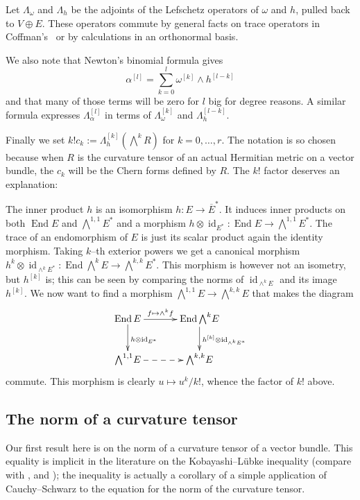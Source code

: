 \documentclass[11pt,a4paper]{amsart}
\def\^#1{^{[#1]}}
\DeclareMathOperator{\id}{id}
\DeclareMathOperator{\End}{End}
\theoremstyle{definition}
\theoremstyle{remark}
\numberwithin{equation}{section}
\begin{document}
Let $\Lambda_\omega$ and $\Lambda_h$ be the adjoints of the Lefschetz
operators of $\omega$ and $h$, pulled back to $V \oplus E$. These
operators commute by general facts on trace operators in
Coffman's~\cite{Coffman} or by calculations in an orthonormal basis.

We also note that Newton's binomial formula gives
$$
\alpha\^{l} = \sum_{k=0}^{l} \omega\^{k} \wedge h\^{l-k}
$$
and that many of those terms will be zero for $l$ big for degree
reasons. A similar formula expresses $\Lambda\^{l}_\alpha$ in terms of
$\Lambda\^{k}_\omega$ and $\Lambda\^{l-k}_h$.

Finally we set $k! c_k := \Lambda\^{k}_h (\bigwedge^k \! R)$ for $k = 0, \ldots,
r$.  The notation is so chosen because when $R$ is the curvature tensor of
an actual Hermitian metric on a vector bundle, the $c_k$ will be the Chern
forms defined by $R$. The $k!$ factor deserves an explanation:

The inner product $h$ is an isomorphism $h : E \to \overline E^*$. It
induces inner products on both $\End E$ and $\bigwedge^{1,1} \! E^*$ and a
morphism $h  \otimes \id_{E^*}: \End E \to \bigwedge^{1,1} \!
E^*$. The trace of an endomorphism of $E$ is just its scalar product
again the identity morphism.  Taking $k$--th exterior powers we get a
canonical morphism
$h^k \otimes \id_{\wedge^k E^*} : \End \bigwedge^k \! E \to
\bigwedge^{k,k} \! E^*$. This morphism is however not an isometry, but
$h\^k$ is; this can be seen by comparing the norms of $\id_{\wedge^k
E}$ and its image $h\^k$. We now want to find a morphism
$\bigwedge^{1,1} \! E \to \bigwedge^{k,k} \! E$ that makes the diagram
$$
\xymatrix@C+10pt{
    \End E \ar[r]^-{f \mapsto \wedge^k f} \ar[d]^{h \otimes \id_{E^*}} & 
    \End \bigwedge^{k} \! E \ar[d]^{h\^k \otimes \id_{\wedge^k E^*}} \\
    \bigwedge^{1,1} \! E \ar@{-->}[r] 
    & \bigwedge^{k,k} \! E
}
$$
commute. This morphism is clearly $u \mapsto u^k / k!$, whence the factor
of $k!$ above.



\subsection*{The norm of a curvature tensor}

Our first result here is on the norm of a curvature tensor of a vector
bundle. This equality is implicit in the literature on the
Kobayashi--L\"{u}bke inequality (compare with \cite{Chen-Ogiue},
\cite{Lubke} and \cite{Siu}); the inequality is actually a corollary of a
simple application of Cauchy--Schwarz to the equation for the norm of the
curvature tensor.
\end{document}
